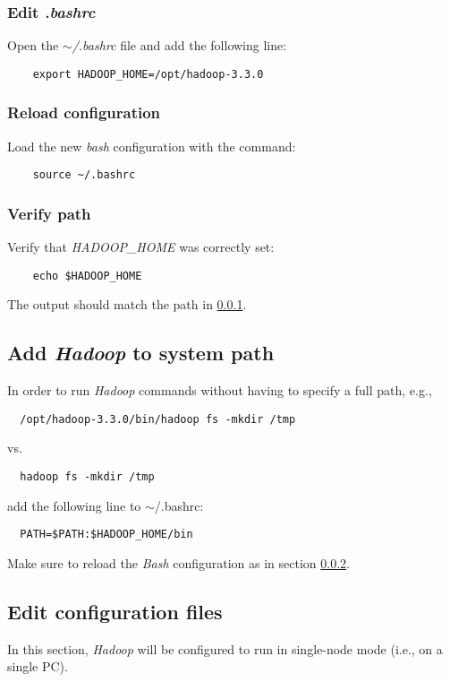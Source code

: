 \documentclass{article}
\begin{document}
    \subsubsection{Edit \emph{.bashrc}}
    \label{subsec:hadoophome}
    Open the \emph{$\sim$/.bashrc} file and add the following line:
    \begin{verbatim}
    export HADOOP_HOME=/opt/hadoop-3.3.0
    \end{verbatim}

    \subsubsection{Reload configuration}
    \label{subsec:reloadbash}
    Load the new \emph{bash} configuration with the command:
    \begin{verbatim}
    source ~/.bashrc
    \end{verbatim}

    \subsubsection{Verify path}
    Verify that \emph{HADOOP\_HOME} was correctly set:
    \begin{verbatim}
    echo $HADOOP_HOME
    \end{verbatim}
    The output should match the path in \ref{subsec:hadoophome}.
    
  \subsection{Add \emph{Hadoop} to system path}
  In order to run \emph{Hadoop} commands without having to specify a full path, e.g.,
  \begin{verbatim}
  /opt/hadoop-3.3.0/bin/hadoop fs -mkdir /tmp
  \end{verbatim}
  vs.
  \begin{verbatim}
  hadoop fs -mkdir /tmp
  \end{verbatim}
  add the following line to $\sim$/.bashrc:
  \begin{verbatim}
  PATH=$PATH:$HADOOP_HOME/bin
  \end{verbatim}
  Make sure to reload the \emph{Bash} configuration as in section \ref{subsec:reloadbash}.

  \subsection{Edit configuration files}
  In this section, \emph{Hadoop} will be configured to run in single-node mode
  (i.e., on a single PC).
\end{document}
